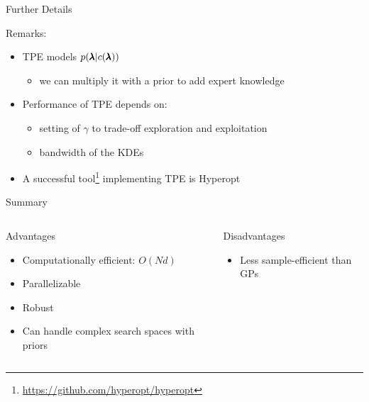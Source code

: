 \begin{frame}[c]{Further Details}

Remarks:

\begin{itemize}
	\item TPE models $p(\pmb{\lambda} | c({\pmb{\lambda}}))$
	\begin{itemize}
		\item we can multiply it with a prior to add expert knowledge
	\end{itemize}
	\smallskip
	
	\pause
	
	\item Performance of TPE depends on:
	\begin{itemize}
		\item setting of $\gamma$ to trade-off exploration and exploitation
		\item bandwidth of the KDEs 
	\end{itemize}
	
	\pause
	
	\smallskip
	
	\smallskip
	\item A successful tool\footnote{\url{https://github.com/hyperopt/hyperopt}} implementing TPE is Hyperopt %
\end{itemize}

\end{frame}
\begin{frame}[c]{Summary}

\begin{columns}[T] %
\begin{column}{.48\textwidth}
    \begin{block}{Advantages}
    \begin{itemize}
    	\item Computationally efficient: $O(Nd)$
    	\item Parallelizable
    	\item Robust
    	\item Can handle complex search spaces with priors
    \end{itemize}
    \end{block}
\end{column}%

\hfill%

\pause

\begin{column}{.48\textwidth}
    \begin{block}{Disadvantages}
    \begin{itemize}
    	\item Less sample-efficient than GPs
    \end{itemize}
    \end{block}
\end{column}
\end{columns}   

\end{frame}
